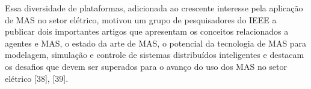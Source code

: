 \documentclass[journal]{IEEEtran}
\begin{document}
Essa diversidade de plataformas, adicionada ao crescente interesse pela aplicação de MAS no setor elétrico, motivou um grupo de pesquisadores do IEEE a publicar dois importantes artigos que apresentam os conceitos relacionados a agentes e MAS, o estado da arte de MAS, o potencial da tecnologia de MAS para modelagem, simulação e controle de sistemas distribuídos inteligentes e destacam os desafios que devem ser superados para o avanço do uso dos MAS no setor elétrico [38], [39]. 




\end{document}
